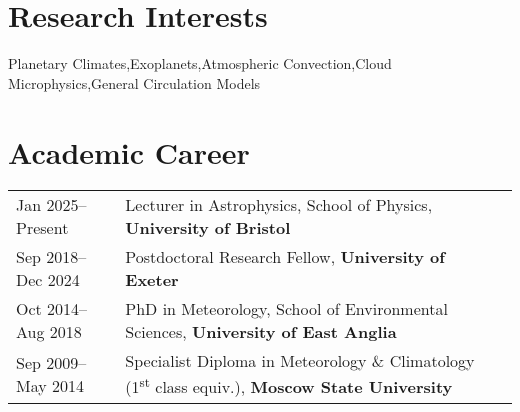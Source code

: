 \documentclass[a4paper, 11pt]{article}
\begin{document}
\thispagestyle{empty}

\keepXColumns



\section{Research Interests}
\vspace{10pt}
Planetary Climates\sep Exoplanets\sep Atmospheric Convection\sep Cloud Microphysics\sep General Circulation Models

\section{Academic Career}
\begin{tabularx}{\linewidth}{@{}l X@{}}
Jan 2025--Present  & Lecturer in Astrophysics, School of Physics, \textbf{University of Bristol} \\
Sep 2018--Dec 2024 & Postdoctoral Research Fellow, \textbf{University of Exeter} \\
Oct 2014--Aug 2018 & PhD in Meteorology, School of Environmental Sciences, \textbf{University of East Anglia} \\
Sep 2009--May 2014 & Specialist Diploma in Meteorology \& Climatology (1\textsuperscript{st} class equiv.), \textbf{Moscow State University}  \\
\end{tabularx}
\end{document}
